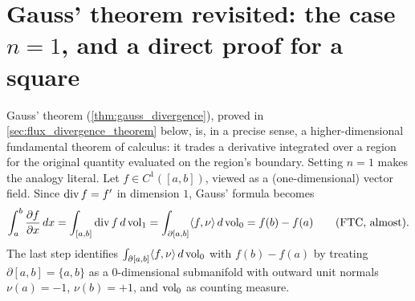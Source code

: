 

\section{Gauss' theorem revisited: the case \texorpdfstring{$n=1$}{n=1}, and a direct proof
for a square}
\label{sec:gauss_intuition}
%

Gauss' theorem (\cref{thm:gauss_divergence}), proved in \cref{sec:flux_divergence_theorem}
below, is, in a precise sense, a higher-dimensional
fundamental theorem of calculus: it trades a derivative integrated over a region for the
original quantity evaluated on the region's boundary. Setting $n=1$ makes the analogy
literal. Let $f \in C^1([a,b])$, viewed as a (one-dimensional) vector field. Since $\operatorname{div} f =
f'$ in dimension $1$, Gauss' formula becomes
\[\int_a^b \frac{\partial f}{\partial x}\,dx = \int_{[a,b]} \operatorname{div} f\,d\operatorname{vol}_1
  = \int_{\partial[a,b]} \langle f,\nu\rangle\,d\operatorname{vol}_0
  = f(b) - f(a) \qquad \text{(FTC, almost).}\]
The last step identifies $\int_{\partial[a,b]} \langle f,\nu\rangle\,d\operatorname{vol}_0$ with $f(b)-f(a)$
by treating $\partial[a,b] = \{a,b\}$ as a $0$-dimensional submanifold with outward unit
normals $\nu(a) = -1$, $\nu(b) = +1$, and $\operatorname{vol}_0$ as counting measure.

